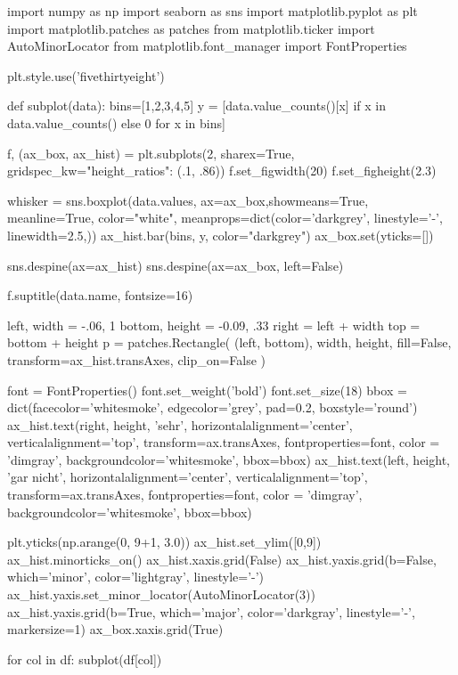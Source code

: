 \begin{python}
import numpy as np
import seaborn as sns
import matplotlib.pyplot as plt
import matplotlib.patches as patches
from matplotlib.ticker import AutoMinorLocator
from matplotlib.font_manager import FontProperties

plt.style.use('fivethirtyeight')

def subplot(data):
    bins=[1,2,3,4,5]
    y = [data.value_counts()[x] if x in data.value_counts() else 0 for x in bins]

    f, (ax_box, ax_hist) = plt.subplots(2, sharex=True, gridspec_kw={"height_ratios": (.1, .86)})
    f.set_figwidth(20)
    f.set_figheight(2.3)

    whisker = sns.boxplot(data.values,
                          ax=ax_box,showmeans=True,
                          meanline=True, color="white",
                          meanprops=dict(color='darkgrey', linestyle='-', linewidth=2.5,))
    ax_hist.bar(bins, y, color="darkgrey")
    ax_box.set(yticks=[])

    sns.despine(ax=ax_hist)
    sns.despine(ax=ax_box, left=False)

    f.suptitle(data.name, fontsize=16)

    left, width = -.06, 1
    bottom, height = -0.09, .33
    right = left + width
    top = bottom + height
    p = patches.Rectangle(
        (left, bottom), width, height,
        fill=False, transform=ax_hist.transAxes, clip_on=False
    )

    font = FontProperties()
    font.set_weight('bold')
    font.set_size(18)
    bbox = dict(facecolor='whitesmoke', edgecolor='grey', pad=0.2, boxstyle='round')
    ax_hist.text(right, height, 'sehr',
        horizontalalignment='center',
        verticalalignment='top',
        transform=ax.transAxes,
        fontproperties=font,
        color = 'dimgray',
        backgroundcolor='whitesmoke',
        bbox=bbox)
    ax_hist.text(left, height, 'gar nicht',
        horizontalalignment='center',
        verticalalignment='top',
        transform=ax.transAxes,
        fontproperties=font,
        color = 'dimgray',
        backgroundcolor='whitesmoke',
        bbox=bbox)

    plt.yticks(np.arange(0, 9+1, 3.0))
    ax_hist.set_ylim([0,9])
    ax_hist.minorticks_on()
    ax_hist.xaxis.grid(False)
    ax_hist.yaxis.grid(b=False, which='minor', color='lightgray', linestyle='-')
    ax_hist.yaxis.set_minor_locator(AutoMinorLocator(3))
    ax_hist.yaxis.grid(b=True, which='major', color='darkgray', linestyle='-', markersize=1)
    ax_box.xaxis.grid(True)

for col in df:
    subplot(df[col])
\end{python}

